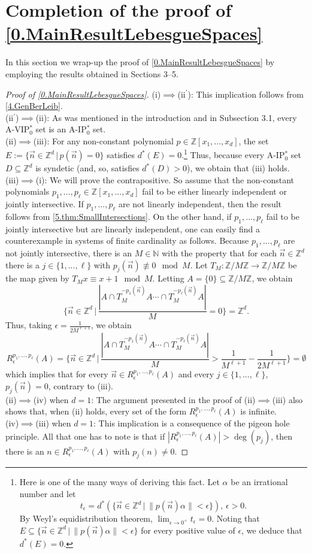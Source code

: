 \documentclass[11pt,american,preprint]{elsarticle}
\numberwithin{equation}{section}
\theoremstyle{plain}
\theoremstyle{plain*}
\theoremstyle{plain}
\theoremstyle{plain*}
\theoremstyle{plain}
\theoremstyle{plain*}
\theoremstyle{remark}
\theoremstyle{remark*}
\theoremstyle{remark}
\theoremstyle{remark*}
\theoremstyle{remark}
\theoremstyle{remark*}
\theoremstyle{plain}
\theoremstyle{definition}
\theoremstyle{plain}
\theoremstyle{plain} %
\newcommand{\N}{\mathbb{N}}
\newcommand{\Z}{\mathbb{Z}}
\begin{document}
\section{Completion of the proof of \cref{0.MainResultLebesgueSpaces}}\label{Sec:6}
In this section we wrap-up the proof of \cref{0.MainResultLebesgueSpaces}
by employing the results obtained in Sections 3--5.
\begin{proof}[Proof of \cref{0.MainResultLebesgueSpaces}]
(i)$\implies$(\rm{ii$^\prime$}): This implication follows from \cref{4.GenBerLeib}.\\
(\rm{ii$^\prime$})$\implies$(ii): As was mentioned in the introduction and in Subsection 3.1, every A-VIP$_0^*$ set is an A-IP$_0^*$ set.\\
(ii)$\implies$(iii): For any non-constant polynomial $p\in\Z[x_1,...,x_d]$, the set $E:=\{\vec n\in\Z^d\,|\,p(\vec n)=0\}$ satisfies $d^*(E)=0$.\footnote{Here is one of the many ways of deriving this fact. Let $\alpha$ be an irrational number and let $$t_\epsilon=d^*(\{\vec n\in\Z^d\,|\,\|p(\vec n)\alpha\|<\epsilon\}),\,\epsilon>0.$$
By Weyl's equidistribution theorem,  $\lim_{\epsilon\rightarrow 0^+}t_\epsilon=0$. Noting that $E\subseteq \{\vec n\in\Z^d\,|\,\|p(\vec n)\alpha\|<\epsilon\}$ for every positive value of $\epsilon$, we deduce that $d^*(E)=0$.} Thus, because every A-IP$_0^*$ set $D\subseteq \Z^d$ is syndetic (and, so, satisfies $d^*(D)>0$), we obtain that (iii) holds. \\
(iii)$\implies$(i): We will prove the contrapositive. So assume that the non-constant polynomials $p_1,...,p_\ell\in\Z[x_1,...,x_d]$ fail to be either linearly independent or jointly intersective. If $p_1,...,p_\ell$ are not linearly independent, then the result follows from \cref{5.thm:SmallIntersections}. On the other hand, if $p_1,...,p_\ell$ fail to be  jointly intersective but are linearly independent, one can easily find a counterexample in systems of finite cardinality as follows. Because $p_1,...,p_\ell$ are not jointly intersective, there is   an $M\in\N$ with the property that for each $\vec n\in\Z^d$ there is a $j\in\{1,...,\ell\}$ with $p_j(\vec n)\not\equiv  0\mod M$. Let $T_M:\Z/M\Z\rightarrow \Z/M\Z$ be the map given by $T_Mx\equiv x+1\mod M$. Letting $A=\{0\}\subseteq\Z/M\Z$, we obtain
$$
\{\vec n\in\Z^d\,|\,\frac{|A\cap T_M^{-p_1(\vec n)}A\cdots \cap T_M^{-p_\ell(\vec n)}A|}{M}=0\}=\Z^d.
$$
Thus, taking $\epsilon=\frac{1}{2M^{\ell+1}}$, we obtain 
$$R_\epsilon^{p_1,...,p_\ell}(A)=\{\vec n\in\Z^d\,|\,\frac{|A\cap T_M^{-p_1(\vec n)}A\cdots \cap T_M^{-p_\ell(\vec n)}A|}{M}>\frac{1}{M^{\ell+1}}-\frac{1}{2M^{\ell+1}}\}=\emptyset$$
which implies that for every $\vec n\in R_\epsilon^{p_1,...,p_\ell}(A)$ and every  $j\in\{1,...,\ell\}$, $p_j(\vec n)= 0$, contrary to (iii).\\
(ii)$\implies$(iv) when $d=1$: The argument presented in the proof of (ii)$\implies$(iii) also shows that, when (ii) holds, every set of the form $R_\epsilon^{p_1,...,p_\ell}(A)$ is infinite.\\
(iv)$\implies$(iii) when $d=1$: This implication is a consequence of the pigeon hole principle. All that one has to note is that if $|R_\epsilon^{p_1,...,p_\ell}(A)|>\deg(p_j)$, then there is an $n\in R_\epsilon^{p_1,...,p_\ell}(A)$ with $p_j(n)\neq 0$.   
\end{proof}
\end{document}
